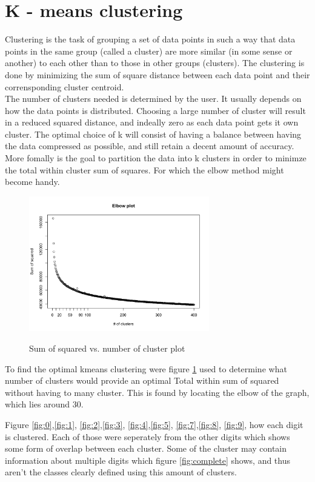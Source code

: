 \documentclass[10pt,a4paper]{article}
\begin{document}
\section{K - means clustering}
Clustering is the task of grouping a set of data points in such a way that data points in the same group (called a cluster) are more similar (in some sense or another) to each other than to those in other groups (clusters).
The clustering is done by minimizing  the sum of square distance between each data point and their corrensponding cluster centroid.  \\

The number of clusters needed  is determined by the user. It usually depends on how the data points  is distributed. Choosing a large number of cluster will result in a reduced squared distance, and indeally zero as each data point gets it own cluster.  The optimal choice of k will consist of having a balance between having the data compressed as possible, and still retain a decent amount of accuracy.  More fomally is the goal to partition the data  into k clusters in order to minimze the total within cluster sum of squares.  For which the elbow method might become handy. \\

\begin{figure}[H]
\centering
\includegraphics[width = 0.7\textwidth]{compl_elbow.png}
\label{fig:elbow}
\caption{Sum of squared vs. number of cluster plot}
\end{figure}

To find the optimal kmeans clustering were figure \ref{fig:elbow} used to determine what number of clusters would provide an optimal Total within sum of squared without having to many cluster.  This is found by locating the elbow of the graph, which lies around 30. 

Figure \ref{fig:0},\ref{fig:1}, \ref{fig:2},\ref{fig:3}, \ref{fig:4},\ref{fig:5}, \ref{fig:7},\ref{fig:8}, \ref{fig:9}, how each digit is clustered.  Each of those were seperately from the other digits which shows some form of overlap between each cluster. Some of the  cluster may contain information about multiple digits which figure \ref{fig:complete} shows, and thus aren't the classes clearly defined using this amount of clusters. 
\end{document}
